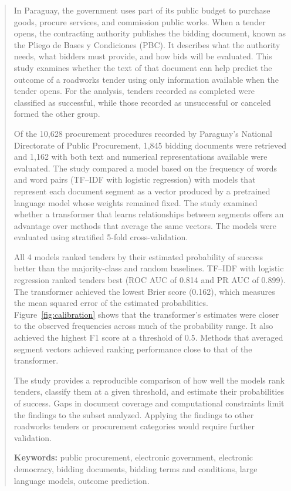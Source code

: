 \clearpage
\begin{abstract}
In Paraguay, the government uses part of its public budget to purchase goods, procure services, and commission public works. When a tender opens, the contracting authority publishes the bidding document, known as the Pliego de Bases y Condiciones (PBC). It describes what the authority needs, what bidders must provide, and how bids will be evaluated. This study examines whether the text of that document can help predict the outcome of a roadworks tender using only information available when the tender opens. For the analysis, tenders recorded as completed were classified as successful, while those recorded as unsuccessful or canceled formed the other group.

Of the 10{,}628 procurement procedures recorded by Paraguay's National Directorate of Public Procurement, 1{,}845 bidding documents were retrieved and 1{,}162 with both text and numerical representations available were evaluated. The study compared a model based on the frequency of words and word pairs (TF--IDF with logistic regression) with models that represent each document segment as a vector produced by a pretrained language model whose weights remained fixed. The study examined whether a transformer that learns relationships between segments offers an advantage over methods that average the same vectors. The models were evaluated using stratified 5-fold cross-validation.

All 4 models ranked tenders by their estimated probability of success better than the majority-class and random baselines. TF--IDF with logistic regression ranked tenders best (ROC AUC of 0.814 and PR AUC of 0.899). The transformer achieved the lowest Brier score (0.162), which measures the mean squared error of the estimated probabilities. Figure~\ref{fig:calibration} shows that the transformer’s estimates were closer to the observed frequencies across much of the probability range. It also achieved the highest F1 score at a threshold of 0.5. Methods that averaged segment vectors achieved ranking performance close to that of the transformer.

The study provides a reproducible comparison of how well the models rank tenders, classify them at a given threshold, and estimate their probabilities of success. Gaps in document coverage and computational constraints limit the findings to the subset analyzed. Applying the findings to other roadworks tenders or procurement categories would require further validation.

\textbf{Keywords:} public procurement, electronic government, electronic democracy, bidding documents, bidding terms and conditions, large language models, outcome prediction.
\end{abstract}
